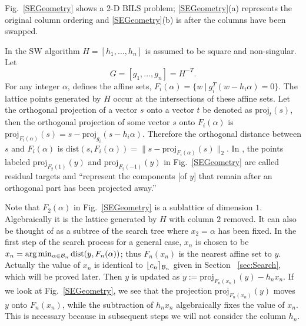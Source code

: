 \documentclass[conference]{IEEEtran}
\newcommand{\dist}{\mathrm{dist}}
\begin{document}
Fig.\ \ref{SEGeometry} shows a 2-D BILS problem;
\ref{SEGeometry}(a) represents the original column ordering and 
\ref{SEGeometry}(b) is after the columns have been swapped.



In the SW algorithm $H=[h_1,\ldots, h_n]$ is assumed to be square and non-singular.
Let 
$$
G =[g_1,\ldots, g_n]= H^{-T}.
$$ 
For any  integer $\alpha$,   \cite{SuW05} defines the
affine sets, $F_i(\alpha) = \{w \ | \ g_i^T(w-h_i\alpha) = 0\}$.
The lattice points generated by $H$ occur at the intersections of these affine sets. 
Let the orthogonal projection of a vector $s$ onto a vector $t$ be denoted as
$\mbox{proj}_t(s)$, then %
the orthogonal projection of some vector $s$ onto $F_i(\alpha)$ is 
$\mbox{proj}_{F_i(\alpha)}(s) = s -\mbox{proj}_{g_i}(s-h_i\alpha).$ 
Therefore the orthogonal distance between $s$ and
$F_i(\alpha)$ is $\dist(s,F_i(\alpha)) =  \| s - \mbox{proj}_{F_i(\alpha)}(s) \|_2$. 
In \cite{SuW05}, the points labeled $\mbox{proj}_{F_2(1)}(y)$ and
$\mbox{proj}_{F_2(-1)}(y)$ in Fig.\  \ref{SEGeometry}
are called residual targets  and ``represent the
components [of $y$] that remain after an orthogonal part has been projected
away.''  

Note that $F_2(\alpha)$ in Fig.\ \ref{SEGeometry} is a sublattice of dimension $1$.  
Algebraically it is the lattice generated by $H$ with column
$2$ removed. It can also be thought of as a subtree of the search tree where
$x_2 = \alpha$ has been fixed. 
In the first step of the search process for a general case,   $x_n$ is chosen to be
 $x_n=\arg\min_{\alpha\in {\cal B}_n}\dist(y,F_n(\alpha))$;
 thus $F_n(x_n)$ is the nearest affine set to $y$. 
Actually the value of $x_n$ is identical to $\lfloor c_n \rceil_{{\cal B}_n}$ given in Section ~\ref{sec:Search},
which will be proved later.
Then   $y$ is updated  as $y := \mbox{proj}_{F_n(x_n)}(y) - h_nx_n$. If we look
at Fig.\ \ref{SEGeometry}, we see that the projection $\mbox{proj}_{F_n(x_n)}(y)$ moves $y$ onto $F_n(x_n)$, while the subtraction of $h_nx_n$ algebraically fixes the value of $x_n$. This is necessary because in subsequent steps we will not consider the column $h_n$.
\end{document}
